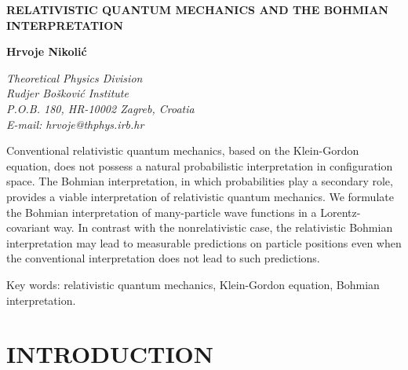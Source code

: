 \documentclass[12pt]{article}
\begin{document}
\noindent
\Large
{\bf RELATIVISTIC QUANTUM MECHANICS AND THE BOHMIAN INTERPRETATION}
\normalsize
\vspace*{1cm}

\noindent
{\bf Hrvoje Nikoli\'c}

\vspace*{0.5cm}
\noindent
{\it
Theoretical Physics Division \\
Rudjer Bo\v{s}kovi\'{c} Institute \\
P.O.B. 180, HR-10002 Zagreb, Croatia \\
E-mail: hrvoje@thphys.irb.hr}

\vspace*{2cm}

\noindent
Conventional relativistic quantum mechanics, based on the Klein-Gordon 
equation, does not possess a natural probabilistic interpretation
in configuration space.
The Bohmian interpretation, in which probabilities play a secondary 
role, provides a viable interpretation of relativistic quantum 
mechanics. We formulate the Bohmian interpretation of many-particle 
wave functions in a Lorentz-covariant way.
In contrast with the nonrelativistic case, the relativistic 
Bohmian interpretation may lead to measurable predictions on particle 
positions even when 
the conventional interpretation does not lead to such predictions. 
\vspace*{0.5cm}

\noindent
Key words: relativistic quantum mechanics, Klein-Gordon equation, 
Bohmian interpretation.

\section{INTRODUCTION}
\label{secI}
\end{document}
